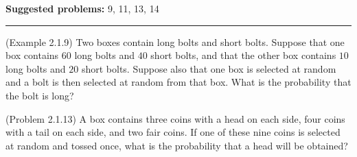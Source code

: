 \documentclass[12pt,reqno]{amsart}
\begin{document}
\textbf{Suggested problems:} 9, 11, 13, 14 

\bigskip
\hrule

\bigskip

\prob (Example 2.1.9) Two boxes contain long bolts and short bolts. Suppose that one box contains $60$ long bolts and $40$ short bolts, and that the other box contains $10$ long bolts and $20$ short bolts. Suppose also that one box is selected at random and a bolt is then selected at random from that box. What is the probability that the bolt is long?

\vfill
\prob (Problem 2.1.13) A box contains three coins with a head on each side, four coins with a tail on each side, and two fair coins. If one of these nine coins is selected at random and tossed once, what is the probability that a head will be obtained?

\vfill
\end{document}
